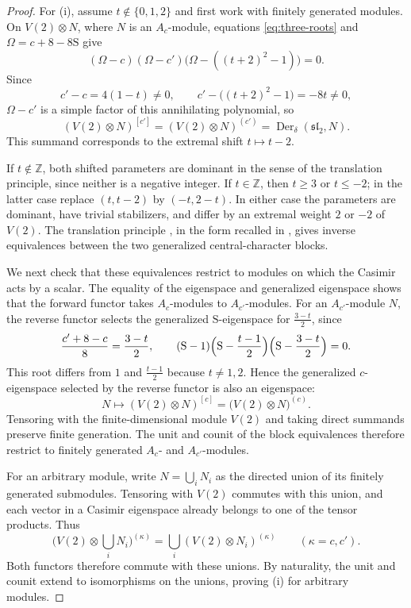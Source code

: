 \documentclass[11pt,reqno]{amsart}
\numberwithin{equation}{section}
\newcommand{\Z}{\mathbb Z}
\newcommand{\s}{\mathfrak{sl}_2}
\DeclareMathOperator{\Der}{Der}
\theoremstyle{definition}
\theoremstyle{remark}
\begin{document}
\begin{proof}
For (i), assume \(t\notin\{0,1,2\}\) and first work with
finitely generated modules. On \(V(2)\otimes N\), where
\(N\) is an \(A_c\)-module, equations
\eqref{eq:three-roots} and \(\Omega=c+8-8\mathrm{S}\) give
\[
(\Omega-c)(\Omega-c')\bigl(\Omega-((t+2)^2-1)\bigr)=0.
\]
Since
\[
c'-c=4(1-t)\ne0,\qquad
c'-\bigl((t+2)^2-1\bigr)=-8t\ne0,
\]
\(\Omega-c'\) is a simple factor of this annihilating polynomial, so
\[
(V(2)\otimes N)^{[c']}=(V(2)\otimes N)^{(c')}
=\Der_\delta(\s,N).
\]
This summand corresponds to the extremal shift \(t\mapsto t-2\).

If \(t\notin\Z\), both shifted parameters are dominant in
the sense of the translation principle, since neither is a
negative integer. If \(t\in\Z\), then \(t\ge3\) or \(t\le-2\);
in the latter case replace \((t,t-2)\) by \((-t,2-t)\).
In either case the parameters are dominant, have trivial
stabilizers, and differ by an extremal weight \(2\) or \(-2\)
of \(V(2)\). The translation principle
\cite[Theorem~4.1]{BG80}, in the form recalled in
\cite[Lemma~12(i)]{CCM21}, gives inverse equivalences between
the two generalized central-character blocks.

We next check that these equivalences restrict to modules on which
the Casimir acts by a scalar. The equality of the eigenspace and generalized
eigenspace shows that the forward functor takes
\(A_c\)-modules to \(A_{c'}\)-modules. For an \(A_{c'}\)-module \(N\),
the reverse functor selects the generalized \(\mathrm{S}\)-eigenspace
for \(\frac{3-t}{2}\), since
\[
\frac{c'+8-c}{8}=\frac{3-t}{2},\qquad
(\mathrm{S}-1)\Bigl(\mathrm{S}-\frac{t-1}{2}\Bigr)
\Bigl(\mathrm{S}-\frac{3-t}{2}\Bigr)=0.
\]
This root differs from \(1\) and \(\frac{t-1}{2}\) because
\(t\ne1,2\). Hence the generalized \(c\)-eigenspace selected
by the reverse functor is also an eigenspace:
\[
N\longmapsto (V(2)\otimes N)^{[c]}
=\bigl(V(2)\otimes N\bigr)^{(c)}.
\]
Tensoring with the finite-dimensional module \(V(2)\) and taking
direct summands preserve finite generation. The unit and counit
of the block equivalences therefore restrict to finitely generated
\(A_c\)- and \(A_{c'}\)-modules.

For an arbitrary module, write \(N=\bigcup_i N_i\) as the directed
union of its finitely generated submodules. Tensoring with \(V(2)\)
commutes with this union, and each vector in a Casimir eigenspace
already belongs to one of the tensor products. Thus
\[
\bigl(V(2)\otimes\bigcup_iN_i\bigr)^{(\kappa)}
=\bigcup_i(V(2)\otimes N_i)^{(\kappa)}
\qquad(\kappa=c,c').
\]
Both functors therefore commute with these unions. By naturality,
the unit and counit extend to isomorphisms on the unions,
proving (i) for arbitrary modules.


\end{proof}
\end{document}
